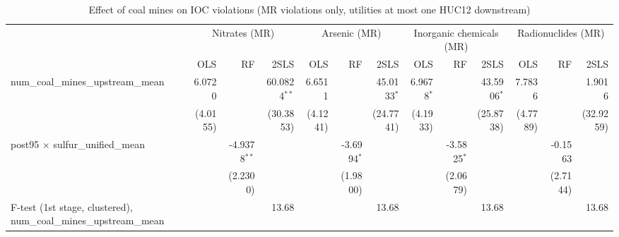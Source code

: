 
\begin{table}[htbp]
   
   \caption{\label{2sls_dwnstrm_minevio_mr} Effect of coal mines on IOC violations (MR violations only, utilities at most one HUC12 downstream)}
   \bigskip
   
   \centering
   
   \begin{adjustbox}{width = \textwidth, center}
      
      
      \begin{tabular}{lrrrrrrrrrrrr}
         \toprule
         
          & \multicolumn{3}{c}{Nitrates (MR)} & \multicolumn{3}{c}{Arsenic (MR)} & \multicolumn{3}{c}{Inorganic chemicals (MR)} & \multicolumn{3}{c}{Radionuclides (MR)}\\
         
                                                                             & OLS      & RF             & 2SLS           & OLS      & RF            & 2SLS          & OLS          & RF            & 2SLS          & OLS      & RF                    & 2SLS\\  
         
         \midrule 
         num\_coal\_mines\_upstream\_mean                                    & 6.0720   &                & 60.0824$^{**}$ & 6.6511   &               & 45.0133$^{*}$ & 6.9678$^{*}$ &               & 43.5906$^{*}$ & 7.7836   &                       & 1.9016\\   
                                                                             & (4.0155) &                & (30.3853)      & (4.1241) &               & (24.7741)     & (4.1933)     &               & (25.8738)     & (4.7789) &                       & (32.9259)\\   
         post95 $\times$ sulfur\_unified\_mean                               &          & -4.9378$^{**}$ &                &          & -3.6994$^{*}$ &               &              & -3.5825$^{*}$ &               &          & -0.1563               &   \\   
                                                                             &          & (2.2300)       &                &          & (1.9800)      &               &              & (2.0679)      &               &          & (2.7144)              &   \\   
         
         F-test (1st stage, clustered), num\_coal\_mines\_upstream\_mean     &          &                & 13.68          &          &               & 13.68         &              &               & 13.68         &          &                       & 13.68\\  
         

\end{tabular}
\end{adjustbox}
\end{table}
